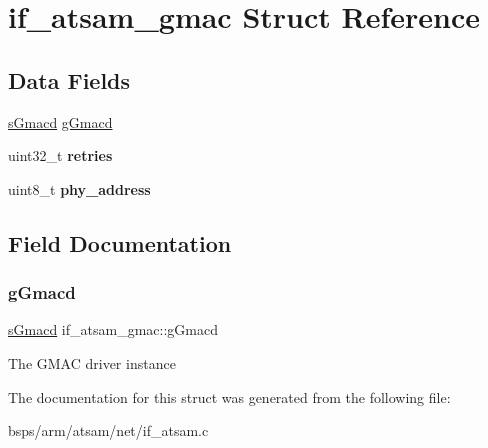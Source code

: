 \hypertarget{structif__atsam__gmac}{}\section{if\+\_\+atsam\+\_\+gmac Struct Reference}
\label{structif__atsam__gmac}
\subsection*{Data Fields}
\begin{DoxyCompactItemize}
\item 
\mbox{\hyperlink{group__gmacd__types_gaa8760917079000a5ee7fbc7fab992dd3}{s\+Gmacd}} \mbox{\hyperlink{structif__atsam__gmac_a79872a890821d27d72c2ee3ad9ba6026}{g\+Gmacd}}
\item 
\mbox{\label{structif__atsam__gmac_a346f6a7f22fc7deebf3630d8d848c621}} 
uint32\+\_\+t {\bfseries retries}
\item 
\mbox{\label{structif__atsam__gmac_af37b40430854a57fbaa7909df159b1bf}} 
uint8\+\_\+t {\bfseries phy\+\_\+address}
\end{DoxyCompactItemize}


\subsection{Field Documentation}
\mbox{\label{structif__atsam__gmac_a79872a890821d27d72c2ee3ad9ba6026}} 
\subsubsection{\texorpdfstring{gGmacd}{gGmacd}}
{\footnotesize\ttfamily \mbox{\hyperlink{group__gmacd__types_gaa8760917079000a5ee7fbc7fab992dd3}{s\+Gmacd}} if\+\_\+atsam\+\_\+gmac\+::g\+Gmacd}

The G\+M\+AC driver instance 

The documentation for this struct was generated from the following file\+:\begin{DoxyCompactItemize}
\item 
bsps/arm/atsam/net/if\+\_\+atsam.\+c\end{DoxyCompactItemize}

